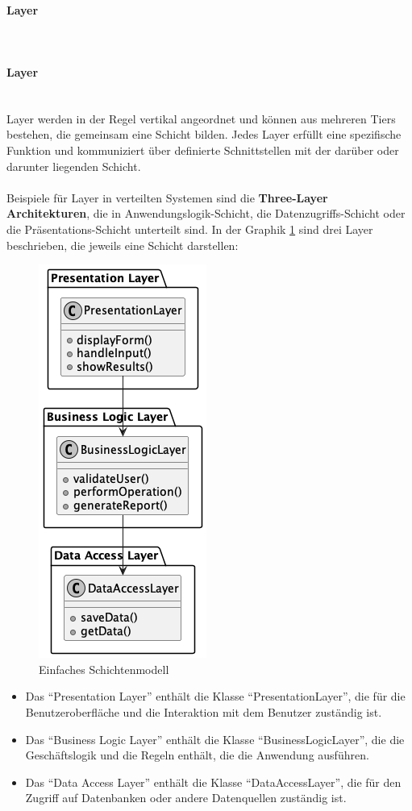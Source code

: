 \documentclass[../vs-script-first-v01.tex]{subfiles}
\begin{document}
\paragraph{Layer}\mbox{}\\
\paragraph{Layer}\mbox{}\\
Layer werden in der Regel vertikal angeordnet und können aus mehreren Tiers bestehen, die gemeinsam eine Schicht bilden. Jedes Layer erfüllt eine spezifische Funktion und  kommuniziert über definierte Schnittstellen mit der darüber oder darunter liegenden Schicht. 
\\\\
Beispiele für Layer in verteilten Systemen sind die \textbf{Three-Layer Architekturen}, die in Anwendungslogik-Schicht, die Datenzugriffs-Schicht oder die Präsentations-Schicht unterteilt sind. In der Graphik \ref{fig:simple-layer} sind drei Layer beschrieben, die jeweils eine Schicht darstellen:
\begin{figure}[!h]
  \centering
  \includegraphics[width=0.25 \textwidth]{fig/uml/simple-layers.png}
  \caption{Einfaches Schichtenmodell}
  \label{fig:simple-layer}
\end{figure}


\begin{itemize}
\item Das \enquote{Presentation Layer} enthält die Klasse \enquote{PresentationLayer}, die für die Benutzeroberfläche und die Interaktion mit dem Benutzer zuständig ist.

\item Das \enquote{Business Logic Layer} enthält die Klasse \enquote{BusinessLogicLayer}, die die Geschäftslogik und die Regeln enthält, die die Anwendung ausführen.

\item Das \enquote{Data Access Layer} enthält die Klasse \enquote{DataAccessLayer}, die für den Zugriff auf Datenbanken oder andere Datenquellen zuständig ist.
\end{itemize}
\end{document}

